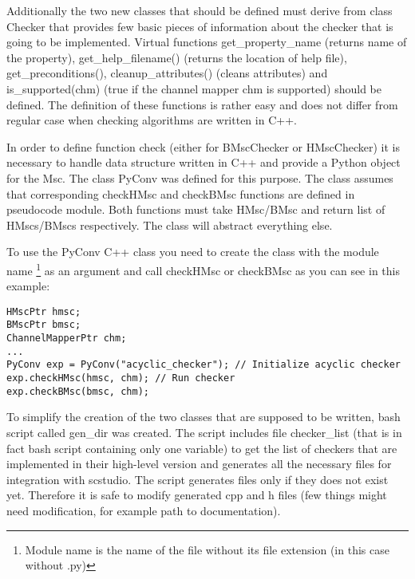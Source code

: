 \documentclass[11pt,oneside]{fithesis2}
\begin{document}
Additionally the two new classes that should be defined must derive from class Checker that provides few basic pieces of information about the checker that is going to be implemented. Virtual functions get\_property\_name (returns name of the property), get\_help\_filename() (returns the location of help file), get\_preconditions(), cleanup\_attributes() (cleans attributes) and is\_supported(chm) (true if the channel mapper chm is supported) should be defined. The definition of these functions is rather easy and does not differ from regular case when checking algorithms are written in C++.

In order to define function check (either for BMscChecker or HMscChecker) it is necessary to handle data structure written in C++ and provide a Python object for the Msc. The class PyConv was defined for this purpose. The class assumes that corresponding checkHMsc and checkBMsc functions are defined in pseudocode module. Both functions must take HMsc/BMsc and return list of HMscs/BMscs respectively. The class will abstract everything else.

To use the PyConv C++ class you need to create the class with the module name \footnote{Module name is the name of the file without its file extension (in this case without .py)} as an argument and call checkHMsc or checkBMsc as you can see in this example:
\begin{lstlisting}
HMscPtr hmsc;
BMscPtr bmsc;
ChannelMapperPtr chm;
...
PyConv exp = PyConv("acyclic_checker"); // Initialize acyclic checker
exp.checkHMsc(hmsc, chm); // Run checker
exp.checkBMsc(bmsc, chm);
\end{lstlisting}

To simplify the creation of the two classes that are supposed to be written, bash script called gen\_dir was created. The script includes file checker\_list (that is in fact bash script containing only one variable) to get the list of checkers that are implemented in their high-level version and generates all the necessary files for integration with scstudio. The script generates files only if they does not exist yet. Therefore it is safe to modify generated cpp and h files (few things might need modification, for example path to documentation).
\end{document}
